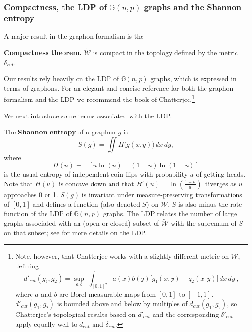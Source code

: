 \documentclass[12pt]{amsart}
\newcommand\be{\begin{equation}}
\newcommand\ee{\end{equation}}
\newcommand{\G}{\mathbb{G}}
\newcommand{\regular}{\mathcal{W}}
\newcommand{\reduced}{\widetilde {\mathcal{W}}}
\begin{document}
{\subsubsection{Compactness, the LDP of $\G(n,p)$ graphs and the Shannon entropy}\phantom{asdf}

A major result in the graphon formalism is the

\smallskip

\noindent \textbf{Compactness theorem.}
$\reduced$ is compact in the topology defined by the metric $\delta_{cut}$.

Our results rely heavily on the LDP of $\G(n,p)$ 
graphs, which is expressed in terms of graphons. 
For an elegant and concise reference for both the 
graphon formalism and the LDP we recommend the book \cite{Ch} of Chatterjee.\footnote{Note, however, that
Chatterjee works with a slightly different metric on
$\regular$, defining 
\[ d'_{cut}(g_1, g_2) = \sup_{a,b}\Big|\int_{[0,1]^2} 
a(x)b(y)\big [ g_1(x,y) - g_2(x,y) \big ] \,dx\, dy\Big|,\]
where $a$ and $b$ are Borel measurable maps from $[0,1]$ to $[-1,1]$. $d'_{cut}(g_1, g_2)$ is bounded 
above and below by multiples of $d_{cut}(g_1, g_2)$, 
so Chatterjee's topological results based on $d'_{cut}$ and the 
corresponding $\delta'_{cut}$ apply equally well to 
$d_{cut}$ and $\delta_{cut}$.}

We next introduce some terms associated with the LDP.

The {\bf Shannon entropy} of a graphon $g$ is  
\be S(g) = \iint H \big (g(x,y)\big ) \, dx \, dy, \ee
where
\be \label{entropy function} H(u) = - [u \ln(u) + (1-u) \ln(1-u)]
\ee
is the usual entropy of independent coin flips with probability $u$ of getting heads.
Note that $H(u)$ is concave down and that $H'(u) = \ln \left (\frac{1-u}{u} \right )$ diverges as 
$u$ approaches 0 or 1. 
$S(g)$ is invariant under measure-preserving
transformations of $[0,1]$ and defines a function 
(also denoted $S$) on $\reduced$. $S$ is also minus the rate function of the LDP of $\G(n,p)$ graphs. The LDP relates the number of 
large graphs associated with an (open or closed)
subset of $\reduced$ with the supremum of $S$ on 
that subset; see \cite{Ch} for more details on the LDP.

}
\end{document}
